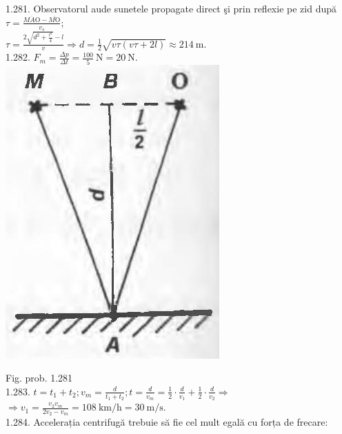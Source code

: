 \documentclass[10pt]{article}
\begin{document}
1.281. Observatorul aude sunetele propagate direct şi prin reflexie pe zid după $\tau=\frac{\overline{M A \mathrm{O}}-\overline{M \mathrm{O}}}{v_{s}}$;\\
$\tau=\frac{2 \sqrt{d^{2}+\frac{l^{2}}{4}}-l}{v} \Rightarrow d=\frac{1}{2} \sqrt{v \tau(v \tau+2 l)} \approx 214 \mathrm{~m}$.\\
1.282. $F_{m}=\frac{\Delta p}{\Delta t}=\frac{100}{5} \mathrm{~N}=20 \mathrm{~N}$.\\
\includegraphics[max width=\textwidth, center]{2025_07_01_5b3ff9fa0d508c8e9f17g-260}

Fig. prob. 1.281\\
1.283. $t=t_{1}+t_{2} ; v_{m}=\frac{d}{t_{1}+t_{2}} ; t=\frac{d}{v_{m}}=\frac{1}{2} \cdot \frac{d}{v_{1}}+\frac{1}{2} \cdot \frac{d}{v_{2}} \Rightarrow$ $\Rightarrow v_{1}=\frac{v_{2} v_{m}}{2 v_{2}-v_{m}}=108 \mathrm{~km} / \mathrm{h}=30 \mathrm{~m} / \mathrm{s}$.\\
1.284. Accelerația centrifugă trebuie să fie cel mult egală cu forța de frecare:
\end{document}
